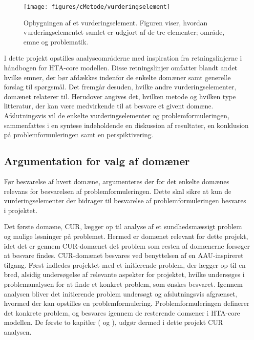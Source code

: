 \begin{figure}[H] 
\begin{center}
\texttt{[image: figures/cMetode/vurderingselement]}
\end{center}
\caption{Opbygningen af et vurderingselement. Figuren viser, hvordan vurderingselementet samlet er udgjort af de tre elementer; område, emne og problematik.}
\label{fig:vurderingselement} 
\end{figure}

I dette projekt opstilles analyseområderne med inspiration fra retningslinjerne i håndbogen for HTA-core modellen. Disse retningslinjer omfatter blandt andet hvilke emner, der bør afdækkes indenfor de enkelte domæner samt generelle forslag til spørgsmål. Det fremgår desuden, hvilke andre vurderingselementer, domænet relaterer til. Herudover angives det, hvilken metode og hvilken type litteratur, der kan være medvirkende til at besvare et givent domæne. \citep{HTAcore} \\
Afslutningsvis vil de enkelte vurderingselementer og problemformuleringen, sammenfattes i en syntese indeholdende en diskussion af resultater, en konklusion på problemformuleringen samt en perspiktivering. 

\subsection{Argumentation for valg af domæner}
Før besvarelse af hvert domæne, argumenteres der for det enkelte domænes relevans for besvarelsen af problemformuleringen. Dette skal sikre at kun de vurderingselementer der bidrager til besvarelse af problemformuleringen besvares i projektet. 

Det første domæne, CUR, lægger op til analyse af et sundhedsmæssigt problem og mulige løsninger på problemet. Hermed er domænet relevant for dette projekt, idet det er gennem CUR-domænet det problem som resten af domænerne forsøger at besvare findes. CUR-domænet besvares ved benyttelsen af en AAU-inspireret tilgang. Først indledes projektet med et initierende problem, der lægger op til en bred, alsidig undersøgelse af relevante aspekter for projektet, hvilke undersøges i problemanalysen for at finde et konkret problem, som ønskes besvaret. Igennem analysen bliver det initierende problem undersøgt og afslutningsvis afgrænset, hvormed der kan opstilles en problemformulering. Problemformuleringen definerer det konkrete problem, og besvares igennem de resterende domæner i HTA-core modellen. De første to kapitler ( og ), udgør dermed i dette projekt CUR analysen. 

